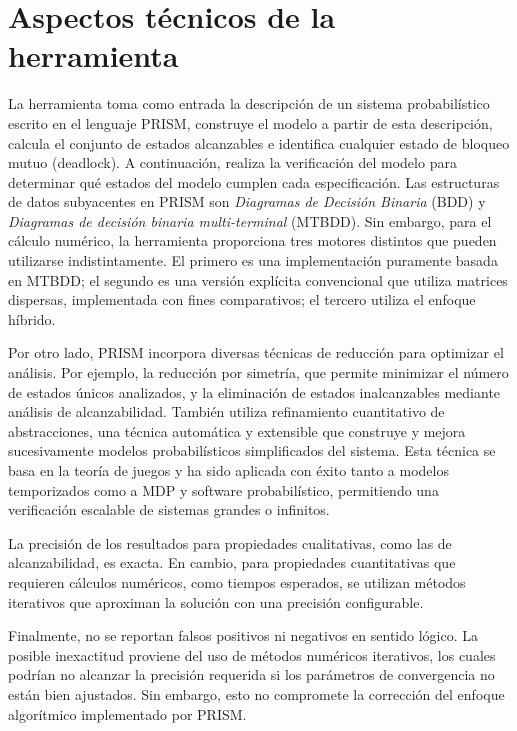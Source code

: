 \documentclass[runningheads]{llncs}
\begin{document}
\section{Aspectos técnicos de la herramienta}
La herramienta toma como entrada la descripción de un sistema probabilístico escrito en el lenguaje PRISM\cite{KNP04b}\cite{Par02}, construye el modelo a partir de esta descripción, calcula el conjunto de estados alcanzables e identifica cualquier estado de bloqueo mutuo (deadlock).
A continuación, realiza la verificación del modelo para determinar qué estados del modelo cumplen cada especificación. Las estructuras de datos subyacentes en PRISM son \textit{Diagramas de Decisión Binaria} (BDD) y \textit{Diagramas de decisión binaria multi-terminal} (MTBDD). Sin embargo, para el cálculo numérico, la herramienta proporciona tres motores distintos que pueden utilizarse indistintamente. El primero es una implementación puramente basada en MTBDD; el segundo es una versión explícita convencional que utiliza matrices dispersas, implementada con fines comparativos; el tercero utiliza el enfoque híbrido.

Por otro lado, PRISM incorpora diversas técnicas de reducción para optimizar el análisis\cite{KNP11}. Por ejemplo, la reducción por simetría, que permite minimizar el número de estados únicos analizados, y la eliminación de estados inalcanzables mediante análisis de alcanzabilidad. También utiliza refinamiento cuantitativo de abstracciones, una técnica automática y extensible que construye y mejora sucesivamente modelos probabilísticos simplificados del sistema. Esta técnica se basa en la teoría de juegos y ha sido aplicada con éxito tanto a modelos temporizados como a MDP y software probabilístico, permitiendo una verificación escalable de sistemas grandes o infinitos.

La precisión de los resultados para propiedades cualitativas, como las de alcanzabilidad, es exacta. En cambio, para propiedades cuantitativas que requieren cálculos numéricos, como tiempos esperados, se utilizan métodos iterativos que aproximan la solución con una precisión configurable.

Finalmente, no se reportan falsos positivos ni negativos en sentido lógico. La posible inexactitud proviene del uso de métodos numéricos iterativos, los cuales podrían no alcanzar la precisión requerida si los parámetros de convergencia no están bien ajustados. Sin embargo, esto no compromete la corrección del enfoque algorítmico implementado por PRISM.
\end{document}
